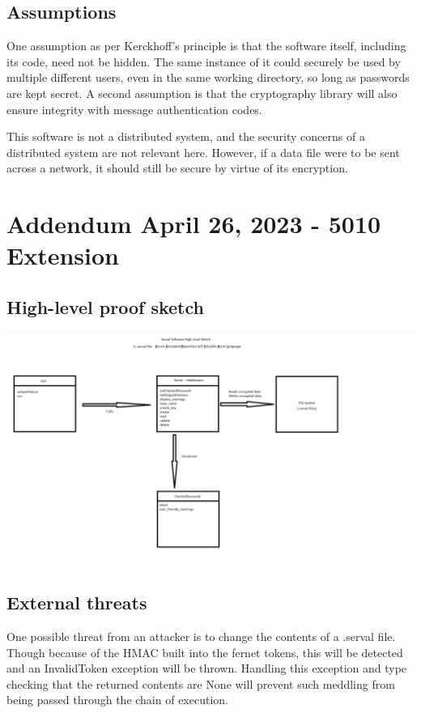 \documentclass[12pt, letterpaper]{article}
\begin{document}
\subsection{Assumptions}
One assumption as per Kerckhoff's principle is that the software itself, including its code, need not be hidden. The same instance of it could securely be used by multiple different users, even in the same working directory, so long as passwords are kept secret. A second assumption is that the cryptography library will also ensure integrity with message authentication codes.

This software is not a distributed system, and the security concerns of a distributed system are not relevant here. However, if a data file were to be sent across a network, it should still be secure by virtue of its encryption.

\section{Addendum April 26, 2023 - 5010 Extension}

\subsection{High-level proof sketch}

\includegraphics[scale=0.4]{High_Level_Proof_Sketch.png}

\subsection{External threats}

One possible threat from an attacker is to change the contents of a .serval file. Though because of the HMAC built into the fernet tokens, this will be detected and an InvalidToken exception will be thrown. Handling this exception and type checking that the returned contents are None will prevent such meddling from being passed through the chain of execution.
\end{document}
